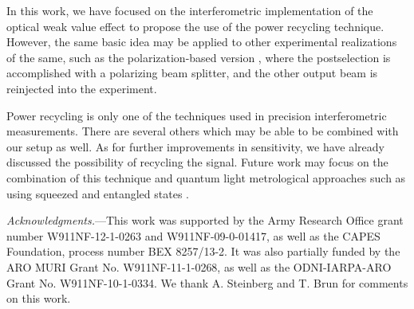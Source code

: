 In this work, we have focused on the interferometric implementation of the optical weak value effect to propose the use of the power recycling technique.  However, the same basic idea may be applied to other experimental realizations of the same, such as the polarization-based version \cite{Hosten2008}, where the postselection is accomplished with a polarizing beam splitter, and the other output beam is reinjected into the experiment.

Power recycling is only one of the techniques used in precision interferometric measurements. There are several others which may be able to be combined with our setup as well.  As for further improvements in sensitivity, we have already discussed the possibility of recycling the signal.  Future work may focus on the combination of this technique and quantum light metrological approaches such as using squeezed and entangled states \cite{Caves1981,Treps2002}.

{\it Acknowledgments.}---This work was supported by the Army Research Office grant number W911NF-12-1-0263 and W911NF-09-0-01417, as well as the CAPES Foundation, process number BEX 8257/13-2. It was also partially funded by the ARO MURI Grant No. W911NF-11-1-0268, as well as the ODNI-IARPA-ARO Grant No. W911NF-10-1-0334. We thank A. Steinberg and T. Brun for comments on this work.

%
%
